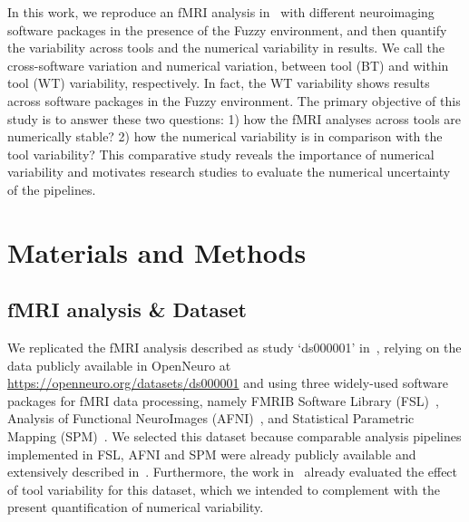 \documentclass[conference]{IEEEtran}
\begin{document}

In this work, we reproduce an fMRI analysis in~\cite{bowring2019exploring} with different neuroimaging software packages in the presence of the Fuzzy environment,
and then quantify the variability across tools and the numerical variability in results.
We call the cross-software variation and numerical variation, between tool (BT) and within tool (WT) variability, respectively.
In fact, the WT variability shows results across software packages in the Fuzzy environment.
The primary objective of this study is to answer these two questions: 1) how the fMRI analyses across tools are numerically stable?
2) how the numerical variability is in comparison with the tool variability?
This comparative study reveals the importance of numerical variability and motivates research studies to evaluate the numerical uncertainty of the pipelines.



\section{Materials and Methods}

\subsection{fMRI analysis \& Dataset}

We replicated the fMRI analysis described as study `ds000001'
in~\cite{schonberg2012decreasing}, relying on the data publicly available
in OpenNeuro at \url{https://openneuro.org/datasets/ds000001} and using
three widely-used software packages for fMRI data processing, namely FMRIB
Software Library (FSL)~\cite{jenkinson2012fsl}, Analysis of Functional
NeuroImages (AFNI)~\cite{cox1996afni}, and Statistical Parametric
Mapping (SPM)~\cite{penny2011statistical}. We selected this dataset because
comparable analysis pipelines implemented in FSL, AFNI and SPM were already 
publicly available and extensively described in~\cite{bowring2019exploring}.
Furthermore, the work in~\cite{bowring2019exploring} already evaluated the
effect of tool variability for this dataset, which we intended to
complement with the present quantification of numerical variability.
\end{document}
